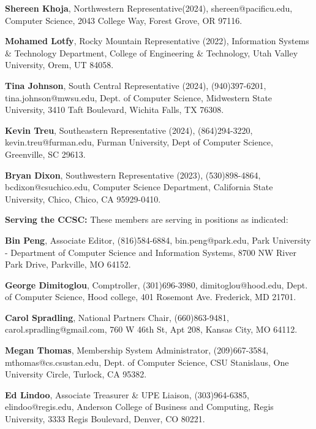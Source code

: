 \documentclass{article}
\begin{document}
\begin{multicols}{2}
\begin{raggedright}
{\noindent
\textbf{Shereen Khoja},	Northwestern Representative(2024), shereen@pacificu.edu,
Computer Science, 2043 College Way, Forest Grove, OR 97116.

\noindent
\textbf{Mohamed Lotfy}, Rocky Mountain Representative (2022), Information Systems \& Technology Department,
College of Engineering \& Technology, Utah Valley University, Orem, UT 84058.

\noindent
\textbf{Tina Johnson}, South Central Representative (2024), (940)397-6201,
tina.johnson@mwsu.edu, Dept. of Computer Science, Midwestern State University,
3410 Taft Boulevard, Wichita Falls, TX 76308.

\noindent
\textbf{Kevin Treu}, Southeastern Representative (2024), (864)294-3220,
kevin.treu@furman.edu, Furman University, Dept of Computer Science, Greenville,
SC 29613.

\noindent
\textbf{Bryan Dixon}, Southwestern Representative (2023), (530)898-4864,
bcdixon@csuchico.edu, Computer Science Department, California State University,
Chico, Chico, CA 95929-0410.

\vspace{0.2in}
\noindent
\textbf{Serving the CCSC:} These members are serving in positions as indicated:

\noindent
\textbf{Bin Peng}, Associate Editor, (816)584-6884,
bin.peng@park.edu, Park University - Department of Computer Science and
Information Systems, 8700 NW River Park Drive, Parkville, MO 64152.

\noindent
\textbf{George Dimitoglou}, Comptroller, (301)696-3980, dimitoglou@hood.edu,
Dept. of Computer Science, Hood college,
401 Rosemont Ave. Frederick, MD 21701.

\noindent
\textbf{Carol Spradling}, National Partners Chair,
(660)863-9481, carol.spradling@gmail.com, 760 W 46th St, Apt 208, Kansas City, MO 64112.

\noindent
\textbf{Megan Thomas}, Membership System Administrator, (209)667-3584,
mthomas@cs.csustan.edu, Dept. of Computer Science, CSU Stanislaus,
One University Circle, Turlock, CA 95382.

\noindent
\textbf{Ed Lindoo}, Associate Treasurer \& UPE Liaison, (303)964-6385, elindoo@regis.edu,
Anderson College of Business and Computing, Regis University, 3333 Regis Boulevard, Denver, CO 80221.

}

\end{raggedright}
\end{multicols}
\end{document}
